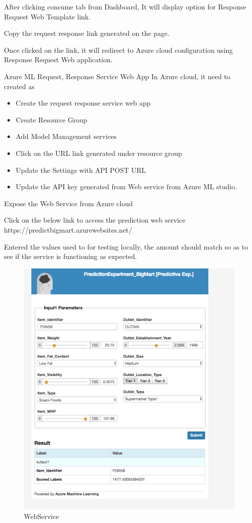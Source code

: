 After clicking consume tab from Dashboard, It will display option for 
Response Request Web Template link.

Copy the request response link generated on the page.

Once clicked on the link, it will redirect to Azure cloud configuration 
using Response Request Web application.

Azure ML Request, Response Service Web App
In Azure cloud, it need to created as

\begin{itemize}
\item Create the request response service web app
\item Create Resource Group
\item Add Model Management services
\item Click on the URL link generated under resource group
\item Update the Settings with API POST URL
\item Update the API key generated from Web service from Azure ML studio.
\end{itemize}

Expose the Web Service from Azure cloud

Click on the below link to access the prediction web service  
https://predictbigmart.azurewebsites.net/

Entered the values used to for testing locally, the amount should 
match so as to see if the service is functioning as expected.

\begin{figure}[pic8]
\centering
\includegraphics[width=\columnwidth]{Images/mlstudio/WebService.png}
\caption{WebService}\label{fig:WebService}
\end{figure}

